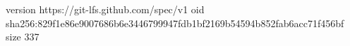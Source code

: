 version https://git-lfs.github.com/spec/v1
oid sha256:829f1e86e9007686b6e3446799947fdb1bf2169b54594b852fab6acc71f456bf
size 337
